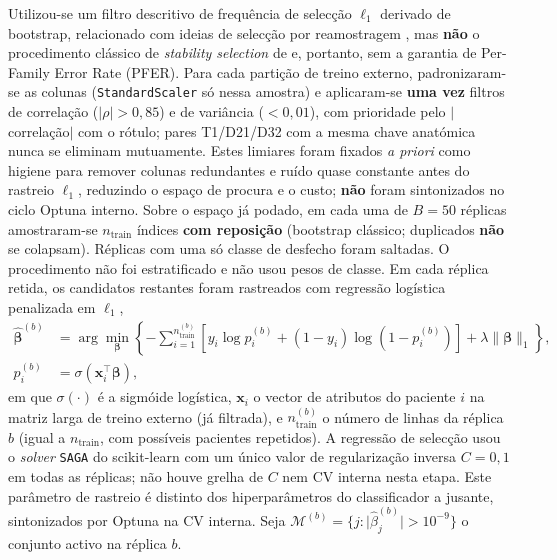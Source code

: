 \documentclass[review]{elsarticle}
\newcommand{\code}[1]{\texttt{#1}}
\begin{document}
Utilizou-se um filtro descritivo de frequência de selecção $\ell_1$ derivado de bootstrap, relacionado com ideias de selecção por reamostragem \citep{bach-2008,meinshausen-2010}, mas \textbf{não} o procedimento clássico de \emph{stability selection} de \citet{meinshausen-2010} e, portanto, sem a garantia de Per-Family Error Rate (PFER).
Para cada partição de treino externo, padronizaram-se as colunas (\code{StandardScaler} só nessa amostra) e aplicaram-se \textbf{uma vez} filtros de correlação ($|\rho|>0{,}85$) e de variância ($<0{,}01$), com prioridade pelo $|$correlação$|$ com o rótulo; pares T1/D21/D32 com a mesma chave anatómica nunca se eliminam mutuamente.
Estes limiares foram fixados \emph{a priori} como higiene para remover colunas redundantes e ruído quase constante antes do rastreio $\ell_1$, reduzindo o espaço de procura e o custo; \textbf{não} foram sintonizados no ciclo Optuna interno.
Sobre o espaço já podado, em cada uma de $B=50$ réplicas amostraram-se $n_{\mathrm{train}}$ índices \textbf{com reposição} (bootstrap clássico; duplicados \textbf{não} se colapsam).
Réplicas com uma só classe de desfecho foram saltadas.
O procedimento não foi estratificado e não usou pesos de classe.
Em cada réplica retida, os candidatos restantes foram rastreados com regressão logística penalizada em $\ell_1$,
\begin{equation}
\begin{aligned}
\hat{\boldsymbol{\beta}}^{(b)}
&= \arg\min_{\boldsymbol{\beta}}
\left\{
-\sum_{i=1}^{n_{\mathrm{train}}^{(b)}}
\left[
y_i \log p_i^{(b)} + (1-y_i)\log\!\left(1-p_i^{(b)}\right)
\right]
+ \lambda \|\boldsymbol{\beta}\|_1
\right\}, \\
p_i^{(b)} &= \sigma\!\left(\mathbf{x}_i^{\top}\boldsymbol{\beta}\right),
\end{aligned}
\label{eq:l1-logistic}
\end{equation}
em que $\sigma(\cdot)$ é a sigmóide logística, $\mathbf{x}_i$ o vector de atributos do paciente $i$ na matriz larga de treino externo (já filtrada), e $n_{\mathrm{train}}^{(b)}$ o número de linhas da réplica $b$ (igual a $n_{\mathrm{train}}$, com possíveis pacientes repetidos).
A regressão de selecção usou o \emph{solver} \code{SAGA} do scikit-learn com um único valor de regularização inversa $C=0{,}1$ em todas as réplicas; não houve grelha de $C$ nem CV interna nesta etapa.
Este parâmetro de rastreio é distinto dos hiperparâmetros do classificador a jusante, sintonizados por Optuna na CV interna.
Seja $\mathcal{M}^{(b)} = \{j : \lvert\hat{\beta}^{(b)}_j\rvert>10^{-9}\}$ o conjunto activo na réplica $b$.
\end{document}
